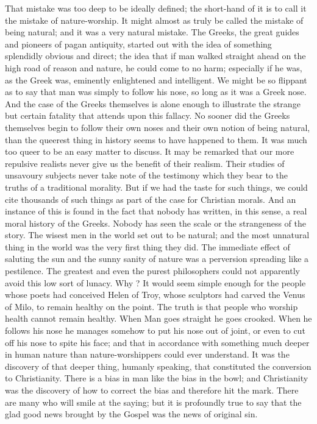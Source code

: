 \documentclass{book}
\begin{document}
That mistake was too deep to be ideally defined; the short-hand of it is to call it the mistake of nature-worship. It might almost as truly be called the mistake of being natural; and it was a very natural mistake. The Greeks, the great guides and pioneers of pagan antiquity, started out with the idea of something splendidly obvious and direct; the idea that if man walked straight ahead on the high road of reason and nature, he could come to no harm; especially if he was, as the Greek was, eminently enlightened and intelligent. We might be so flippant as to say that man was simply to follow his nose, so long as it was a Greek nose. And the case of the Greeks themselves is alone enough to illustrate the strange but certain fatality that attends upon this fallacy. No sooner did the Greeks themselves begin to follow their own noses and their own notion of being natural, than the queerest thing in history seems to have happened to them. It was much too queer to be an easy matter to discuss. It may be remarked that our more repulsive realists never give us the benefit of their realism. Their studies of unsavoury subjects never take note of the testimony which they bear to the truths of a traditional morality. But if we had the taste for such things, we could cite thousands of such things as part of the case for Christian morals. And an instance of this is found in the fact that nobody has written, in this sense, a real moral history of the Greeks. Nobody has seen the scale or the strangeness of the story. The wisest men in the world set out to be natural; and the most unnatural thing in the world was the very first thing they did. The immediate effect of saluting the sun and the sunny sanity of nature was a perversion spreading like a pestilence. The greatest and even the purest philosophers could not apparently avoid this low sort of lunacy. Why ? It would seem simple enough for the people whose poets had conceived Helen of Troy, whose sculptors had carved the Venus of Milo, to remain healthy on the point. The truth is that people who worship health cannot remain healthy. When Man goes straight he goes crooked. When he follows his nose he manages somehow to put his nose out of joint, or even to cut off his nose to spite his face; and that in accordance with something much deeper in human nature than nature-worshippers could ever understand. It was the discovery of that deeper thing, humanly speaking, that constituted the conversion to Christianity. There is a bias in man like the bias in the bowl; and Christianity was the discovery of how to correct the bias and therefore hit the mark. There are many who will smile at the saying; but it is profoundly true to say that the glad good news brought by the Gospel was the news of original sin.
\end{document}
